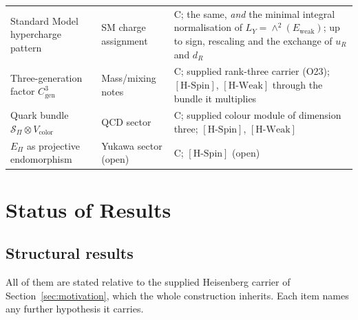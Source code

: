 \documentclass[11pt,a4paper]{article}
\theoremstyle{definition}
\newcommand{\Sbundle}{\mathcal{S}_\Pi}
\newcommand{\Epi}{E_\Pi}
\newcommand{\Cgen}{C^3_{\mathrm{gen}}}
\newcommand{\Ew}{E_{\mathrm{weak}}}
\newcommand{\HSpin}{\ensuremath{[\mathrm{H\text{-}Spin}]}}
\newcommand{\HWeak}{\ensuremath{[\mathrm{H\text{-}Weak}]}}
\begin{document}
\begin{longtable}[c]{@{}>{\raggedright\arraybackslash}p{4.6cm}
         >{\raggedright\arraybackslash}p{3.6cm}>{\raggedright\arraybackslash}p{4.6cm}@{}}
        Standard Model hypercharge pattern
          & SM charge assignment
          & C; the same, \emph{and} the minimal integral normalisation of $L_Y = \wedge^2(\Ew)$; up to sign,
            rescaling and the exchange of $u_R$ and $d_R$ \\
        Three-generation factor $\Cgen$
          & Mass/mixing notes
          & C; supplied rank-three carrier (O23); \HSpin{}, \HWeak{} through the bundle it multiplies \\
        Quark bundle $\Sbundle \otimes V_{\mathrm{color}}$ & QCD sector & C; supplied colour module of dimension three;
        \HSpin{}, \HWeak{} \\
        $\Epi$ as projective endomorphism & Yukawa sector (open) & C; \HSpin{} (open) \\
        \bottomrule
      \end{longtable}

  \section{Status of Results}
    \label{sec:status}

    \subsection{Structural results}
      \label{sec:structural}

      All of them are stated relative to the supplied Heisenberg carrier of
      Section~\ref{sec:motivation}, which the whole construction inherits.
      Each item names any further hypothesis it carries.
\end{document}
